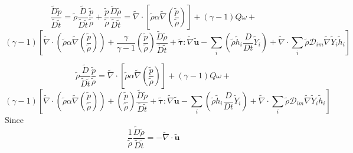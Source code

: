 \documentclass[preprint,12pt,authoryear]{elsarticle}
\begin{document}
{\newpage

\[
         \frac{\tilde{D}  \tilde{p}} {\tilde{D}\tilde{t} }
         =
         \tilde{\rho}  
         \frac{\tilde{D} } {\tilde{D}\tilde{t} }
         \frac{ \tilde{p}}{ \tilde{\rho}}
         +
         \frac{ \tilde{p}}{ \tilde{\rho}}
         \frac{\tilde{D} \tilde{\rho}} {\tilde{D}\tilde{t} }
        = 
		\tilde{\nabla} \cdot 
			\left[ \tilde{\rho} \alpha
		\tilde{\nabla} (\frac{ \tilde{p} }{  \tilde{\rho} } )\right]
                +
        (\gamma - 1) Q \omega
        +
\]
\[
        (\gamma - 1)
        \left[
        \tilde{\nabla} \cdot 
		\left( 
		\tilde{\rho} \alpha
		\tilde{\nabla} (\frac{ \tilde{p} }{  \tilde{\rho} } )
		\right)
        +
        \frac{ \gamma }{ \gamma - 1 }
        (\frac{ \tilde{p} }{  \tilde{\rho} } )
		 \frac{\tilde{D}\tilde{\rho} } {\tilde{D}\tilde{t}}
		 +
        \pmb{\tilde{\tau}}:\tilde{\nabla} \tilde{\mathbf{u}} 
        -
        \sum\limits_i
        \left(
                 \tilde{\rho}\tilde{h}_i
                \frac{D}{Dt}
		\tilde{Y}_i
		\right)
        +
        \tilde{\nabla} \cdot
        \sum\limits_i 
        \tilde{\rho}\mathcal{D}_{im}\tilde{\nabla}\tilde{Y}_i     
        \tilde{h}_i
        \right]
\]

\[
         \tilde{\rho}  
         \frac{\tilde{D} } {\tilde{D}\tilde{t} }
         \frac{ \tilde{p}}{ \tilde{\rho}}
        = 
		\tilde{\nabla} \cdot 
			\left[ \tilde{\rho} \alpha
		\tilde{\nabla} (\frac{ \tilde{p} }{  \tilde{\rho} } )\right]
                +
        (\gamma - 1) Q \omega
        +
\]
\[
        (\gamma - 1)
        \left[
        \tilde{\nabla} \cdot 
		\left( 
		\tilde{\rho} \alpha
		\tilde{\nabla} (\frac{ \tilde{p} }{  \tilde{\rho} } )
		\right)
        +
        (\frac{ \tilde{p} }{  \tilde{\rho} } )
		 \frac{\tilde{D}\tilde{\rho} } {\tilde{D}\tilde{t}}
		 +
        \pmb{\tilde{\tau}}:\tilde{\nabla} \tilde{\mathbf{u}} 
        -
        \sum\limits_i
        \left(
                 \tilde{\rho}\tilde{h}_i
                \frac{D}{Dt}
		\tilde{Y}_i
		\right)
        +
        \tilde{\nabla} \cdot
        \sum\limits_i 
        \tilde{\rho}\mathcal{D}_{im}\tilde{\nabla}\tilde{Y}_i     
        \tilde{h}_i
        \right]
\]
Since
\[   \frac{1} {  \tilde{\rho} } 
		 \frac{\tilde{D}\tilde{\rho} } {\tilde{D}\tilde{t}}
	 =
	 - \tilde{\nabla} \cdot \tilde{\mathbf{u}}
\]


}
\end{document}
